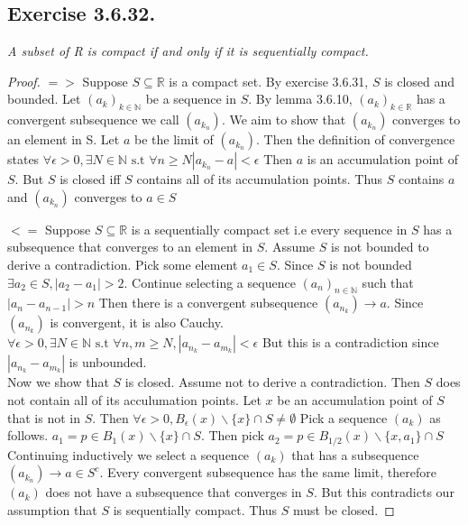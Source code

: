 \documentclass[12pt, a4paper]{article}
\newcommand{\mbr}{\mathbb{R}}
\newcommand{\mbn}{\mathbb{N}}
\newcommand {\ep}{\epsilon}
\newcommand {\st}{\text{ s.t }}
\begin{document}
\subsection*{Exercise 3.6.32.}
    \textit{A subset of R is compact if and only if it is sequentially
    compact.}
    \begin{proof}
        $=>$ Suppose $S\subseteq \mbr$ is a compact set. By exercise 3.6.31, $S$ is closed and bounded. 
        Let $(a_k)_{k \in \mbn}$ be a sequence in $S$. By lemma 3.6.10, $(a_k)_{k\in \mbr}$ has a convergent subsequence we call $(a_{k_n})$.
        We aim to show that $(a_{k_n})$ converges to an element in S. Let $a$ be the limit of $(a_{k_n})$. 
        Then the definition of convergence states $\forall \ep > 0, \exists N \in \mbn \st \forall n \ge N |a_{k_n}-a| < \ep$
        Then $a$ is an accumulation point of $S$. But $S$ is closed iff $S$ contains all of its accumulation points. 
        Thus $S$ contains $a$ and $(a_{k_n})$ converges to $a\in S$
        
        $<=$ Suppose $S\subseteq \mbr$ is a sequentially compact set i.e every sequence in $S$ has a subsequence that converges to an element in $S$.
        Assume $S$ is not bounded to derive a contradiction. Pick some element $a_1 \in S$. Since $S$ is not bounded
        $\exists a_2 \in S, |a_2 - a_1| > 2$. Continue selecting a sequence $(a_n)_{n\in \mbn}$ such that $|a_n - a_{n-1}| > n$
        Then there is a convergent subsequence $(a_{n_k}) \rightarrow a$. Since $(a_{n_k})$ is convergent, it is also Cauchy. 
        $\forall \ep >0 ,\exists N \in \mbn \st \forall n,m \ge N, |a_{n_k} - a_{m_k}| < \ep$ 
        But this is a contradiction since $|a_{n_k} - a_{m_k}|$ is unbounded. \\
        Now we show that $S$ is closed. Assume not to derive a contradiction. Then $S$ does not contain all of its acculumation points. 
        Let $x$ be an accumulation point of $S$ that is not in $S$. Then $\forall \ep > 0, B_{\ep}(x)\backslash \{x\} \cap S \not = \emptyset$
        Pick a sequence $(a_k)$ as follows. $a_1 = p\in B_{1}(x)\backslash \{x\} \cap S$. Then pick $a_2 = p\in B_{1/2}(x)\backslash \{x, a_1\} \cap S$
        Continuing inductively we select a sequence $(a_k)$ that has a subsequence $(a_{k_n})\rightarrow a\in S^c$. 
        Every convergent subsequence has the same limit, therefore $(a_k)$ does not have a subsequence that converges in $S$. 
        But this contradicts our assumption that $S$ is sequentially compact. Thus $S$ must be closed. 


    \end{proof}
\end{document}
